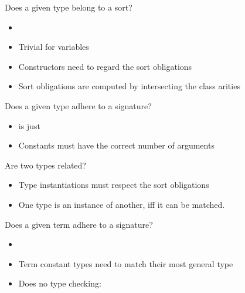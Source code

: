 \begin{frame}{Does a given type belong to a sort?}
    \begin{itemize}
        \item {} 
        \item Trivial for variables
        \item Constructors need to regard the sort obligations
        \item Sort obligations are computed by intersecting the class arities
    \end{itemize}
\end{frame}

\begin{frame}{Does a given type adhere to a signature?}
    \begin{itemize}
        \item {} is just 
        \item Constants must have the correct number of arguments
    \end{itemize}
\end{frame}

\begin{frame}{Are two types related?}
    \begin{itemize}
        \item Type instantiations must respect the sort obligations
        \item One type is an instance of another, iff it can be matched.
    \end{itemize}
\end{frame}

\begin{frame}{Does a given term adhere to a signature?}
    \begin{itemize}
        \item {} \isa{{\isacharcolon}{\isacharcolon}} 
        \item Term constant types need to match their most general type
        \item Does no type checking:  
    \end{itemize}
\end{frame}

